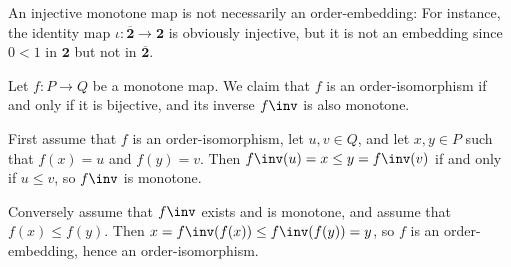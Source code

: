 \documentclass[article, a4paper, 11pt, oneside]{memoir}
\numberwithin{equation}{chapter}
\theoremstyle{nonumberplain}
\begin{document}
\begin{remark}
    An injective monotone map is not necessarily an order-embedding: For instance, the identity map $\iota \colon \overline{\mathbf{2}} \to \mathbf{2}$ is obviously injective, but it is not an embedding since $0 < 1$ in $\mathbf{2}$ but not in $\overline{\mathbf{2}}$.
\end{remark}


\begin{remarkbreak}
    \label{rem:order-isomorphisms}
    Let $f \colon P \to Q$ be a monotone map. We claim that $f$ is an order-isomorphism if and only if it is bijective, and its inverse $f\inv$ is also monotone.

    First assume that $f$ is an order-isomorphism, let $u,v \in Q$, and let $x,y \in P$ such that $f(x) = u$ and $f(y) = v$. Then $f\inv(u) = x \leq y = f\inv(v)$ if and only if $u \leq v$, so $f\inv$ is monotone.

    Conversely assume that $f\inv$ exists and is monotone, and assume that $f(x) \leq f(y)$. Then $x = f\inv(f(x)) \leq f\inv(f(y)) = y$, so $f$ is an order-embedding, hence an order-isomorphism.
\end{remarkbreak}
\end{document}
